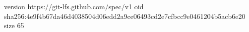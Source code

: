 version https://git-lfs.github.com/spec/v1
oid sha256:4e9f4b67da46d4038504d06edd2a9ce06493cd2e7cfbcc9e0461204b5acb6e20
size 65
